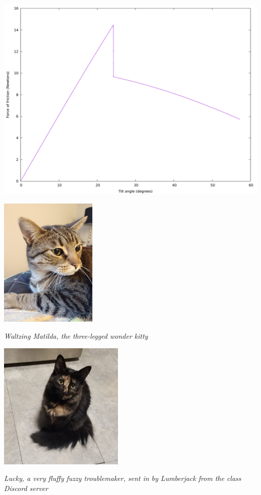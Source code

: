 \documentclass[12pt]{article}
\newcommand{\BS}{\bigskip}
\begin{document}
\begin{minipage}{0.5\textwidth}
\includegraphics[width=\textwidth]{tilt.pdf}
\end{minipage}
\begin{minipage}{0.5\textwidth}
\begin{center}
\includegraphics[width=0.35\textwidth]{matilda.jpg}

\scriptsize \it Waltzing Matilda, the three-legged wonder kitty

\BS\BS

\includegraphics[width=0.45\textwidth]{lucky.jpg}

\scriptsize \it Lucky, a very fluffy fuzzy troublemaker, sent in by Lumberjack from the class Discord server
\end{center}
\end{minipage}
\end{document}
